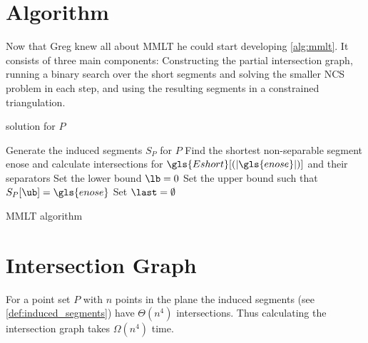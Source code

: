 \section{Algorithm}
Now that Greg knew all about \gls{MMLT} he could start developing
\cref{alg:mmlt}. It consists of three main components: Constructing
the partial intersection graph, running a binary search over the short
segments and solving the smaller \gls{NCS} problem in each step, and
using the resulting segments in a constrained triangulation.

\begin{algorithm}
  \DontPrintSemicolon
   solution for \(P\)
  
  
  Generate the induced segments \(S_P\) for \(P\) \;
  Find the shortest non-separable segment \gls{enose}
  and calculate intersections for 
  \(\gls{Eshort}[(|\gls{enose}|)]\) and their separators \;
  Set the lower bound \(\lb = 0\) \;
  Set the upper bound \ub such that \(S_P[\ub] = \gls{enose}\) \;
  Set \(\last = \emptyset\) \;
  \caption{\label{alg:mmlt}\gls{MMLT} algorithm}
\end{algorithm}

\section{Intersection Graph}\label{sec:mmlt_intersection_graph}
For a point set \(P\) with \(n\) points in the plane 
the induced segments (see
\cref{def:induced_segments}) have \(\Theta(n^4)\) intersections.
\cite{quadrilaterals_bound} Thus calculating the intersection graph
takes \(\Omega(n^4)\) time.

